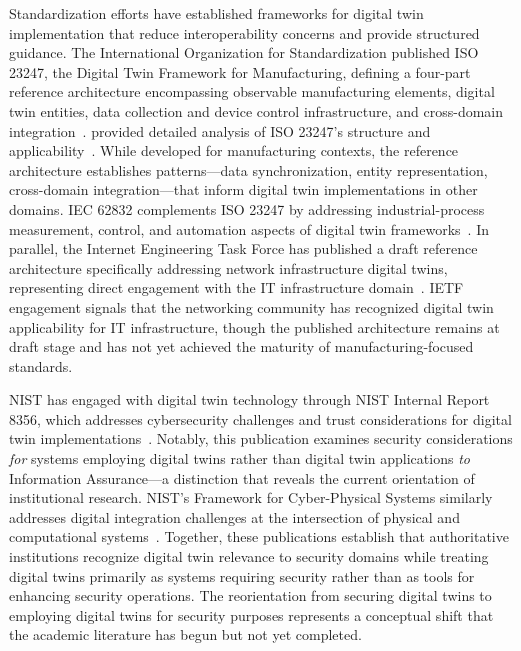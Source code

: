 Standardization efforts have established frameworks for digital twin implementation that reduce interoperability concerns and provide structured guidance. The International Organization for Standardization published ISO 23247, the Digital Twin Framework for Manufacturing, defining a four-part reference architecture encompassing observable manufacturing elements, digital twin entities, data collection and device control infrastructure, and cross-domain integration~\parencite{ISO_23247_2021}. \citeauthor{Shao_ISO_23247_2023} provided detailed analysis of ISO 23247's structure and applicability~\parencite{Shao_ISO_23247_2023}. While developed for manufacturing contexts, the reference architecture establishes patterns---data synchronization, entity representation, cross-domain integration---that inform digital twin implementations in other domains. IEC 62832 complements ISO 23247 by addressing industrial-process measurement, control, and automation aspects of digital twin frameworks~\parencite{Shao_2021}. In parallel, the Internet Engineering Task Force has published a draft reference architecture specifically addressing network infrastructure digital twins, representing direct engagement with the IT infrastructure domain~\parencite{IETF_NDT_2024}. IETF engagement signals that the networking community has recognized digital twin applicability for IT infrastructure, though the published architecture remains at draft stage and has not yet achieved the maturity of manufacturing-focused standards.

NIST has engaged with digital twin technology through NIST Internal Report 8356, which addresses cybersecurity challenges and trust considerations for digital twin implementations~\parencite{NIST_IR_8356_2025}. Notably, this publication examines security considerations \textit{for} systems employing digital twins rather than digital twin applications \textit{to} Information Assurance---a distinction that reveals the current orientation of institutional research. NIST's Framework for Cyber-Physical Systems similarly addresses digital integration challenges at the intersection of physical and computational systems~\parencite{NIST_CPS_Framework_2017}. Together, these publications establish that authoritative institutions recognize digital twin relevance to security domains while treating digital twins primarily as systems requiring security rather than as tools for enhancing security operations. The reorientation from securing digital twins to employing digital twins for security purposes represents a conceptual shift that the academic literature has begun but not yet completed.

